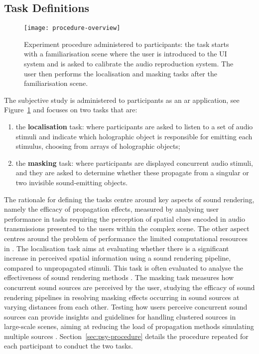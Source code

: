 \subsection{Task Definitions}
\begin{figure}[htbp]%
    \centering
    \texttt{[image: procedure-overview]}
    \caption[Overview of psychoacoustic experiment procedures]{Experiment procedure administered to participants: the task starts with a familiarisation scene where the user is introduced to the UI system and is asked to calibrate the audio reproduction system. The user then performs the localisation and masking tasks after the familiarisation scene.}\label{fig:psycho-procedure-overview}
\end{figure}
The subjective study is administered to participants as an \acrshort{ar} application, see Figure~\ref{fig:psycho-procedure-overview} and focuses on two tasks that are:
\begin{enumerate}
    \item the \textbf{localisation} task: where participants are asked to listen to a set of audio stimuli and indicate which holographic object is responsible for emitting each stimulus, choosing from arrays of holographic objects;
    \item the \textbf{masking} task: where participants are displayed concurrent audio stimuli, and they are asked to determine whether these propagate from a singular or two invisible sound-emitting objects.
\end{enumerate}
The rationale for defining the tasks centre around key aspects of sound rendering, namely the efficacy of propagation effects, measured by analysing user performance in tasks requiring the perception of spatial clues encoded in audio transmissions presented to the users within the complex scene. The other aspect centres around the problem of performance the limited computational resources in .
The localisation task aims at evaluating whether there is a significant increase in perceived spatial information using a sound rendering pipeline, compared to unpropagated stimuli. This task is often evaluated to analyse the effectiveness of sound rendering methods \citep{rungta2016psychoacoustic}.
The masking task measures how concurrent sound sources are perceived by the user, studying the efficacy of sound rendering pipelines in resolving masking effects occurring in sound sources at varying distances from each other. Testing how users perceive concurrent sound sources can provide insights and guidelines for handling clustered sources in large-scale scenes, aiming at reducing the load of propagation methods simulating multiple sources \citep{schissler2016interactive}.
Section~\ref{sec:psy-procedure} details the procedure repeated for each participant to conduct the two tasks.

